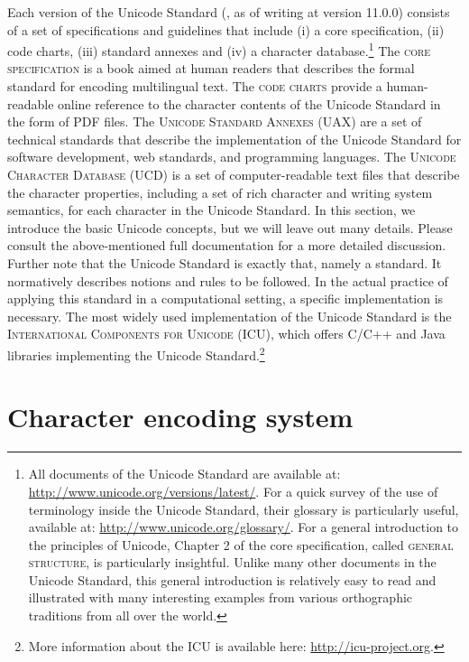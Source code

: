 Each version of the Unicode Standard (\citealp{Unicode2018}, as of writing at
version 11.0.0) consists of a set of specifications and guidelines that include (i) a
core specification, (ii) code charts, (iii) standard annexes and (iv) a
character database.\footnote{All documents of the Unicode Standard are available
at: \url{http://www.unicode.org/versions/latest/}. For a quick survey of the use
of terminology inside the Unicode Standard, their glossary is particularly
useful, available at: \url{http://www.unicode.org/glossary/}. For a general
introduction to the principles of Unicode, Chapter 2 of the core specification,
called \textsc{general structure}, is particularly insightful. Unlike 
many other documents in the Unicode Standard, this general introduction is
relatively easy to read and illustrated with many interesting examples from
various orthographic traditions from all over the world.} The \textsc{core
specification} is a book aimed at human readers that describes the formal
standard for encoding multilingual text. The \textsc{code charts} provide a
human-readable online reference to the character contents of the Unicode
Standard in the form of PDF files. The \textsc{Unicode Standard Annexes (UAX)}
are a set of technical standards that describe the implementation of the Unicode
Standard for software development, web standards, and programming languages.
The \textsc{Unicode Character Database (UCD)} is a set of computer-readable text
files that describe the character properties, including a set of rich character
and writing system semantics, for each character in the Unicode Standard. In
this section, we introduce the basic Unicode concepts, but we will leave out
many details. Please consult the above-mentioned full documentation for a more
detailed discussion. Further note that the Unicode Standard is exactly that,
namely a standard. It normatively describes notions and rules to be followed. In
the actual practice of applying this standard in a computational setting, a
specific implementation is necessary. The most widely used implementation of the
Unicode Standard is the \textsc{International Components for Unicode (ICU)},
which offers C/C++ and Java libraries implementing the Unicode
Standard.\footnote{More information about the ICU is available here:
\url{http://icu-project.org}.}

\section{Character encoding system}
\label{character-encoding-system}

